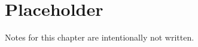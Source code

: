\documentclass[../../notes.tex]{subfiles}
\begin{document}

\chapter{Placeholder}\label{ch:ph}

Notes for this chapter are intentionally not written.
\end{document}
